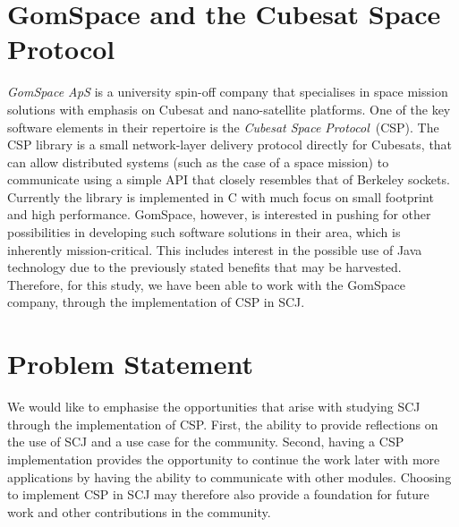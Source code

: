 \section{GomSpace and the Cubesat Space Protocol} %
\label{sec:gomspace_and_the_cubesat_space_protocol}
\textit{GomSpace ApS} is a university spin-off company that specialises in space mission solutions with emphasis on Cubesat and nano-satellite platforms\cite{GomSpace}. One of the key software elements in their repertoire is the \textit{Cubesat Space Protocol}~(CSP). The CSP library is a small network-layer delivery protocol directly for Cubesats, that can allow distributed systems (such as the case of a space mission) to communicate using a simple API that closely resembles that of Berkeley sockets. Currently the library is implemented in C with much focus on small footprint and high performance. GomSpace, however, is interested in pushing for other possibilities in developing such software solutions in their area, which is inherently mission-critical. This includes interest in the possible use of Java technology due to the previously stated benefits that may be harvested. Therefore, for this study, we have been able to work with the GomSpace company, through the implementation of CSP in SCJ. 


\section{Problem Statement} %
\label{sec:problem_statement}
We would like to emphasise the opportunities that arise with studying SCJ through the implementation of CSP. First, the ability to provide reflections on the use of SCJ and a use case for the community. Second, having a CSP implementation provides the opportunity to continue the work later with more applications by having the ability to communicate with other modules. Choosing to implement CSP in SCJ may therefore also provide a foundation for future work and other contributions in the community.

